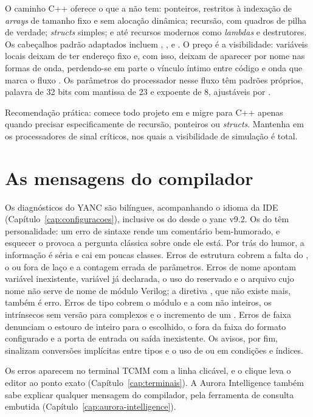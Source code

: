 O caminho C++ oferece o que a \cmm{} não tem: ponteiros, restritos à indexação de \textit{arrays} de tamanho fixo e sem alocação dinâmica; recursão, com quadros de pilha de verdade; \textit{structs} simples; e até recursos modernos como \textit{lambdas} e destrutores. Os cabeçalhos padrão adaptados incluem , ,  e . O preço é a visibilidade: variáveis locais deixam de ter endereço fixo e, com isso, deixam de aparecer por nome nas formas de onda, perdendo-se em parte o vínculo íntimo entre código e onda que marca o fluxo \cmm{}. Os parâmetros do processador nesse fluxo têm padrões próprios, palavra de 32 bits com mantissa de 23 e expoente de 8, ajustáveis por .

\begin{nota}
Recomendação prática: comece todo projeto em \cmm{} e migre para C++ apenas quando precisar especificamente de recursão, ponteiros ou \textit{structs}. Mantenha em \cmm{} os processadores de sinal críticos, nos quais a visibilidade de simulação é total.
\end{nota}

\section{As mensagens do compilador}
\label{sec:mensagens-compilador}

Os diagnósticos do YANC são bilíngues, acompanhando o idioma da IDE (Capítulo~\ref{cap:configuracoes}), inclusive os do  desde o yanc v9.2. Os do  têm personalidade: um erro de sintaxe rende um comentário bem-humorado, e esquecer o  provoca a pergunta clássica sobre onde ele está. Por trás do humor, a informação é séria e cai em poucas classes. Erros de estrutura cobrem a falta do , o  ou  fora de laço e a contagem errada de parâmetros. Erros de nome apontam variável inexistente, variável já declarada, o uso do  reservado e o arquivo cujo nome não serve de nome de módulo Verilog; a diretiva , que não existe mais, também é erro. Erros de tipo cobrem o módulo e a  com não inteiros, os intrínsecos sem versão para complexos e o incremento de um . Erros de faixa denunciam o estouro de inteiro para o  escolhido, o  fora da faixa do formato configurado e a porta de entrada ou saída inexistente. Os avisos, por fim, sinalizam conversões implícitas entre tipos e o uso de  ou  em condições e índices.

Os erros aparecem no terminal TCMM com a linha clicável, e o clique leva o editor ao ponto exato (Capítulo~\ref{cap:terminais}). A Aurora Intelligence também sabe explicar qualquer mensagem do compilador, pela ferramenta de consulta embutida (Capítulo~\ref{cap:aurora-intelligence}).

